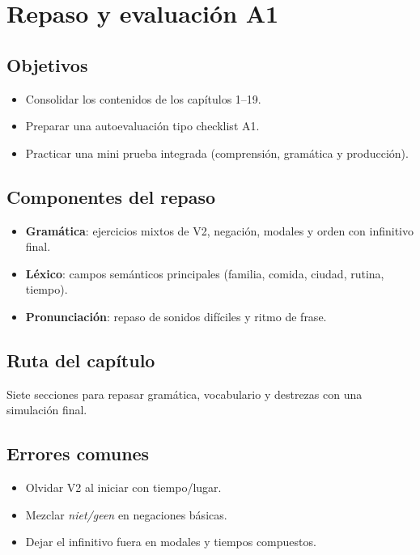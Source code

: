 \chapter{Repaso y evaluación A1}
\section{Objetivos}
\begin{itemize}[leftmargin=*]
	\item Consolidar los contenidos de los capítulos 1--19.
	\item Preparar una autoevaluación tipo checklist A1.
	\item Practicar una mini prueba integrada (comprensión, gramática y producción).
\end{itemize}

\section{Componentes del repaso}
\begin{itemize}[leftmargin=*]
	\item \textbf{Gramática}: ejercicios mixtos de V2, negación, modales y orden con infinitivo final.
	\item \textbf{Léxico}: campos semánticos principales (familia, comida, ciudad, rutina, tiempo).
	\item \textbf{Pronunciación}: repaso de sonidos difíciles y ritmo de frase.
\end{itemize}

\section{Ruta del capítulo}
Siete secciones para repasar gramática, vocabulario y destrezas con una simulación final.









\section{Errores comunes}
\begin{itemize}[leftmargin=*]
	\item Olvidar V2 al iniciar con tiempo/lugar.
	\item Mezclar \textit{niet/geen} en negaciones básicas.
	\item Dejar el infinitivo fuera en modales y tiempos compuestos.
\end{itemize}

